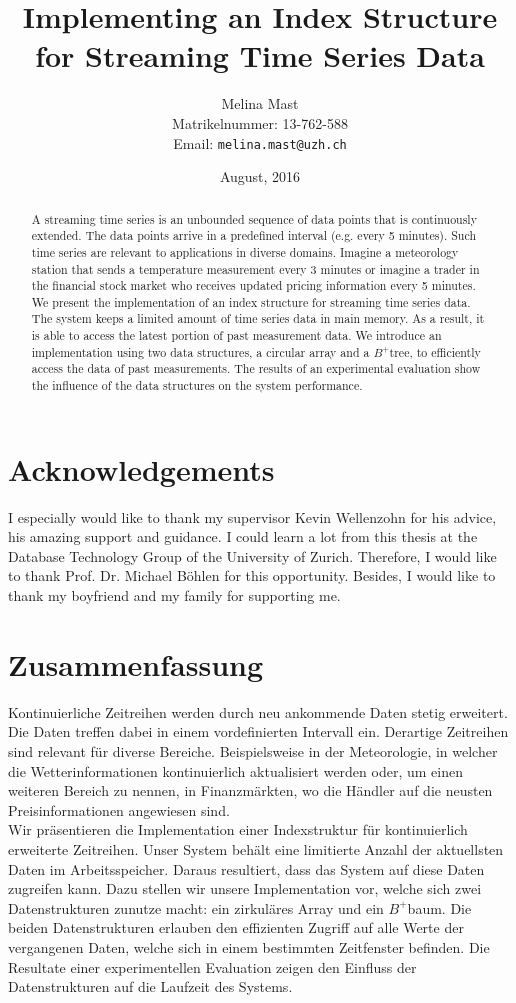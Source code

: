 \documentclass[abstracton,12pt,oneside]{scrreprt}
\title{Implementing an Index Structure for Streaming Time Series Data}
\author{
  Melina Mast\\[-5pt]
  \scriptsize Matrikelnummer: 13-762-588\\[-5pt]
  \scriptsize Email: \texttt{melina.mast@uzh.ch}
}
\date{\vspace*{2cm}August, 2016}
\begin{document}
\maketitle

\chapter*{Acknowledgements}
I especially would like to thank my supervisor Kevin Wellenzohn for his advice, his amazing support and guidance. I could learn a lot from this thesis at the Database Technology Group of the University of Zurich. Therefore, I would like to thank Prof. Dr. Michael Böhlen for this opportunity. Besides, I would like to thank my boyfriend and my family for supporting me.


\begin{abstract}
A streaming time series is an unbounded sequence of data points that is continuously extended. The data points arrive in a predefined interval (e.g. every 5 minutes). Such time series are relevant to applications in diverse domains. Imagine a meteorology station that sends a temperature measurement every 3 minutes or imagine a trader in the financial stock market who receives updated pricing information every 5 minutes.\\
We present the implementation of an index structure for streaming time series data. The system keeps a limited amount of time series data in main memory. As a result, it is able to access the latest portion of past measurement data. We introduce an implementation using two data structures, a circular array and a $B^+$tree, to efficiently access the data of past measurements. The results of an experimental evaluation show the influence of the data structures on the system performance. 

\end{abstract}

\chapter*{Zusammenfassung}
Kontinuierliche Zeitreihen werden durch neu ankommende Daten stetig erweitert. Die Daten treffen dabei in einem vordefinierten Intervall ein.
Derartige Zeitreihen sind relevant für diverse Bereiche. Beispielsweise in der Meteorologie, in welcher die Wetterinformationen kontinuierlich aktualisiert werden oder, um einen weiteren Bereich zu nennen, in Finanzmärkten, wo die Händler auf die neusten Preisinformationen angewiesen sind.\\
Wir präsentieren die Implementation einer Indexstruktur für kontinuierlich erweiterte Zeitreihen. Unser System behält eine limitierte Anzahl der aktuellsten Daten im Arbeitsspeicher. Daraus resultiert, dass das System auf diese Daten zugreifen kann. Dazu stellen wir unsere Implementation vor, welche sich zwei Datenstrukturen zunutze macht: ein zirkuläres Array und ein $B^+$baum. Die beiden Datenstrukturen erlauben den effizienten Zugriff auf alle Werte der vergangenen Daten, welche sich in einem bestimmten Zeitfenster befinden. Die Resultate einer experimentellen Evaluation zeigen den Einfluss der Datenstrukturen auf die Laufzeit des Systems.
\end{document}
